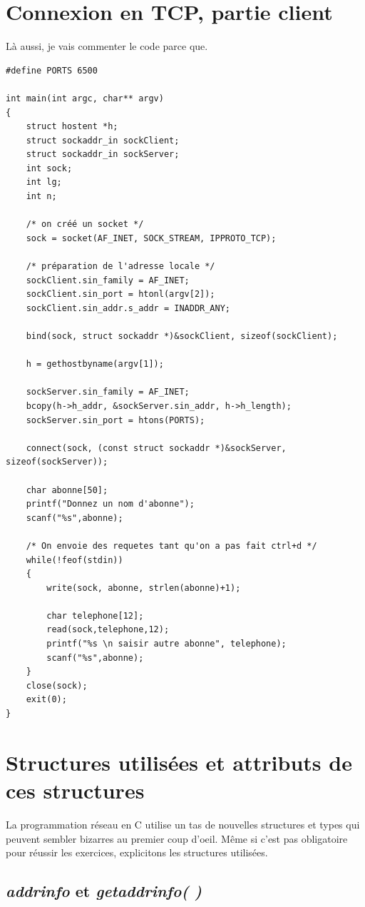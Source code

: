 \documentclass{report}
\begin{document}
\section{Connexion en TCP, partie client}
Là aussi, je vais commenter le code parce que.
\begin{lstlisting}
#define PORTS 6500

int main(int argc, char** argv)
{
	struct hostent *h;
	struct sockaddr_in sockClient;
	struct sockaddr_in sockServer;
	int sock;
	int lg;
	int n;
	
	/* on créé un socket */
	sock = socket(AF_INET, SOCK_STREAM, IPPROTO_TCP);
	
	/* préparation de l'adresse locale */
	sockClient.sin_family = AF_INET;
	sockClient.sin_port = htonl(argv[2]);
	sockClient.sin_addr.s_addr = INADDR_ANY;
	
	bind(sock, struct sockaddr *)&sockClient, sizeof(sockClient);
	
	h = gethostbyname(argv[1]);
	
	sockServer.sin_family = AF_INET;
	bcopy(h->h_addr, &sockServer.sin_addr, h->h_length);
	sockServer.sin_port = htons(PORTS);
	
	connect(sock, (const struct sockaddr *)&sockServer, sizeof(sockServer));
	
	char abonne[50];
	printf("Donnez un nom d'abonne");
	scanf("%s",abonne);
	
	/* On envoie des requetes tant qu'on a pas fait ctrl+d */
	while(!feof(stdin))
	{
		write(sock, abonne, strlen(abonne)+1);
		
		char telephone[12];
		read(sock,telephone,12);
		printf("%s \n saisir autre abonne", telephone);
		scanf("%s",abonne);
	}
	close(sock);
	exit(0);
}
\end{lstlisting}


\section{Structures utilisées et attributs de ces structures}
La programmation réseau en C utilise un tas de nouvelles structures et types qui peuvent sembler bizarres au premier coup d'oeil. Même si c'est pas obligatoire pour réussir les exercices, explicitons les structures utilisées.\\
\subsection{\emph{addrinfo} et \emph{getaddrinfo( )}}
\end{document}
